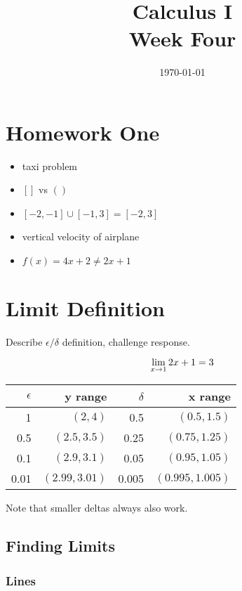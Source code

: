 \documentclass[letterpaper, landscape]{exam}
\author{}
\date{\today}
\title{Calculus I \\ Week Four}
\begin{document}
  \maketitle
  \tableofcontents

  \section{Homework One} 
  \begin{itemize}
    \item taxi problem
    \item $[]$ vs $()$
    \item $[-2, -1] \cup [-1, 3] = [-2, 3]$
    \item vertical velocity of airplane 
    \item $f(x) = 4x + 2 \neq 2x + 1$
  \end{itemize}

  \section{Limit Definition}

  Describe $\epsilon/\delta$ definition, challenge response.

  \[
    \lim_{x \to 1} 2x + 1 = 3 \\
  \]

  \begin{tabular}[H]{rrrr}
    \toprule
    $\epsilon$ & y range        & $\delta$ & x range \\
    \midrule
    1          & $(2, 4)$       & 0.5      & $(0.5, 1.5)$ \\
    0.5        & $(2.5, 3.5)$   & 0.25     & $(0.75, 1.25)$ \\
    0.1        & $(2.9, 3.1)$   & 0.05     & $(0.95, 1.05)$ \\
    0.01       & $(2.99, 3.01)$ & 0.005    & $(0.995, 1.005)$ \\
    \bottomrule
  \end{tabular}

  Note that smaller deltas always also work.

  \subsection{Finding Limits}

  \subsubsection{Lines}
\end{document}
